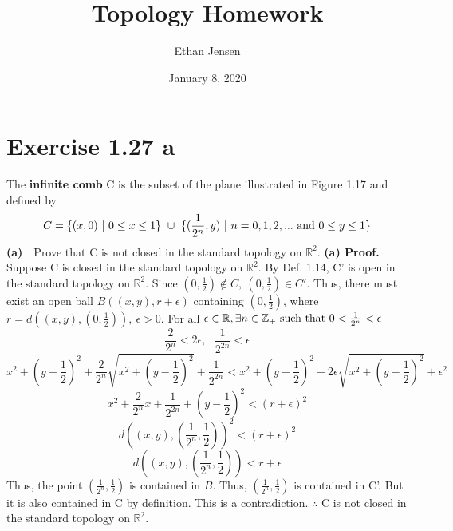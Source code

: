 \documentclass[12pt]{article}
\title{Topology Homework}
\author{Ethan Jensen}
\date{January 8, 2020}
\begin{document}
	\maketitle
  \section[20pt]{Exercise 1.27 a}
  The \textbf{infinite comb} C is the subset of the plane illustrated
  in Figure 1.17 and defined by
  \[C=\{(x,0)\ |\ 0\leq x \leq 1\}\ \cup \ \{(\frac{1}{2^n}, y)\ |\ n=0,1,2,... \textup{ and } 0 \leq y \leq 1\}\]
	\textbf{(a)}\ \ Prove that C is not closed in the standard topology on \(\mathbb{R}^2\).\newline \newline
	\textbf{(a)  Proof.} \newline
	Suppose C is closed in the standard topology on \(\mathbb{R}^2\). \newline
	By Def. 1.14, C' is open in the standard topology on \(\mathbb{R}^2\). \newline
	Since \((0,\frac{1}{2}) \notin C,\ (0,\frac{1}{2}) \in C'\). Thus, there must exist an open ball \newline \(B((x,y), r + \epsilon)\) containing \((0,\frac{1}{2})\), where \(r=d((x,y),(0,\frac{1}{2})),\ \epsilon > 0\). \newline
	For all \(\epsilon \in \mathbb{R}, \exists n \in \mathbb{Z}_+ \textup{ such that } 0 < \frac{1}{2^{n}} < \epsilon \)
	\[\frac{2}{2^n}<2\epsilon,\ \ \ \frac{1}{2^{2n}}<\epsilon\]
	\[x^2 + (y-\frac{1}{2})^2 + \frac{2}{2^n}\sqrt{x^2+(y-\frac{1}{2})^2}+\frac{1}{2^{2n}} < x^2 + (y-\frac{1}{2})^2 + 2\epsilon \sqrt{x^2+(y-\frac{1}{2})^2} + \epsilon^2\]
	\[x^2+\frac{2}{2^n}x +\frac{1}{2^{2n}} + (y-\frac{1}{2})^2 < (r+\epsilon)^2\]
	\[d\left((x,y),(\frac{1}{2^n}, \frac{1}{2})\right)^2 < (r+\epsilon)^2\]
	\[d\left((x,y),(\frac{1}{2^n}, \frac{1}{2})\right) < r+\epsilon\]
	Thus, the point \((\frac{1}{2^n},\frac{1}{2})\) is contained in \(B\).
	\newline
	Thus, \((\frac{1}{2^n},\frac{1}{2})\) is contained in C'. But it is also contained in C by definition. This is a contradiction. \newline
	\(\therefore\) C is not closed in the standard topology on \(\mathbb{R}^2\). \newline
	\blacksquare
\end{document}
